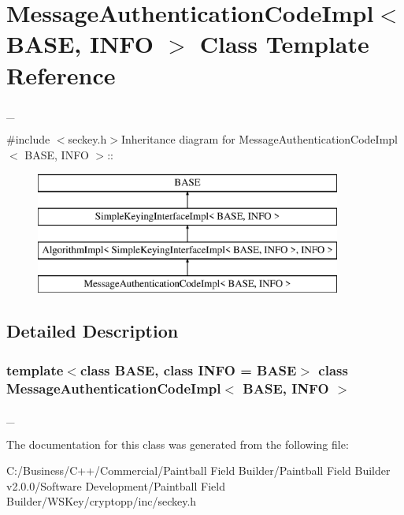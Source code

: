 \hypertarget{class_message_authentication_code_impl}{
\section{MessageAuthenticationCodeImpl$<$ BASE, INFO $>$ Class Template Reference}
\label{class_message_authentication_code_impl}
}


\_\-  


{\ttfamily \#include $<$seckey.h$>$}Inheritance diagram for MessageAuthenticationCodeImpl$<$ BASE, INFO $>$::\begin{figure}[H]
\begin{center}
\leavevmode
\includegraphics[height=4cm]{class_message_authentication_code_impl}
\end{center}
\end{figure}


\subsection{Detailed Description}
\subsubsection*{template$<$class BASE, class INFO = BASE$>$ class MessageAuthenticationCodeImpl$<$ BASE, INFO $>$}

\_\- 

The documentation for this class was generated from the following file:\begin{DoxyCompactItemize}
\item 
C:/Business/C++/Commercial/Paintball Field Builder/Paintball Field Builder v2.0.0/Software Development/Paintball Field Builder/WSKey/cryptopp/inc/seckey.h\end{DoxyCompactItemize}
